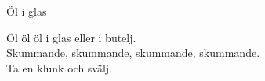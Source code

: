 \begin{song}{Öl i glas}
	
	
	
	Öl öl öl i glas eller i butelj.\\
	Skummande, skummande, skummande, skummande.\\
	Ta en klunk och svälj.
	
\end{song}
